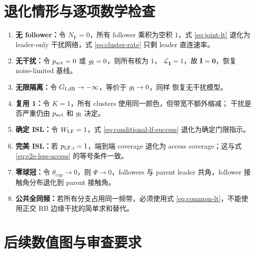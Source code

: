 \documentclass[UTF8,a4paper,11pt]{ctexart}
\newcommand{\NF}{N_{\mathrm F}}
\newcommand{\thetac}{\theta_{\mathrm{cap}}}
\newcommand{\Lcal}{\mathcal L}
\newcommand{\Ivec}{\bm I}
\begin{document}
\section{退化情形与逐项数学检查}

\begin{enumerate}[leftmargin=2em]
  \item \textbf{无 follower：}令 $\NF=0$，所有 follower 乘积为空积 $1$，式
  \eqref{eq:joint-lt} 退化为 leader-only 干扰网络，式 \eqref{eq:cluster-rate} 只剩
  leader 直连速率。
  \item \textbf{无干扰：}令 $p_{\rm act}=0$ 或 $g_{\rm I}=0$，则所有核为 $1$，
  $\Lcal_{\Ivec}=1$，故 $\Ivec=\bm0$，恢复 noise-limited 基线。
  \item \textbf{无限隔离：}令 $G_{\rm I,dB}\to-\infty$，等价于 $g_{\rm I}\to0$，同样
  恢复无干扰模型。
  \item \textbf{复用 1：}令 $K=1$，所有 clusters 使用同一颜色，但带宽不额外缩减；
  干扰是否严重仍由 $p_{\rm act}$ 和 $g_{\rm I}$ 决定。
  \item \textbf{确定 ISL：}令 $W_{\rm LF}=1$，式 \eqref{eq:conditional-lf-success}
  退化为确定门限指示。
  \item \textbf{完美 ISL：}若 $p_{{\rm LF},i}=1$，端到端 coverage 退化为 access
  coverage；这与式 \eqref{eq:e2e-less-access} 的等号条件一致。
  \item \textbf{零球冠：}令 $\thetac\to0$，则 $\Psi\to0$，followers 与 parent leader
  共角，follower 接触角分布退化到 parent 接触角。
  \item \textbf{公共全同频：}若所有分支占用同一频带，必须使用式
  \eqref{eq:common-lt}，不能使用正交 RB 边缘干扰的简单求和替代。
\end{enumerate}

\section{后续数值图与审查要求}
\end{document}
